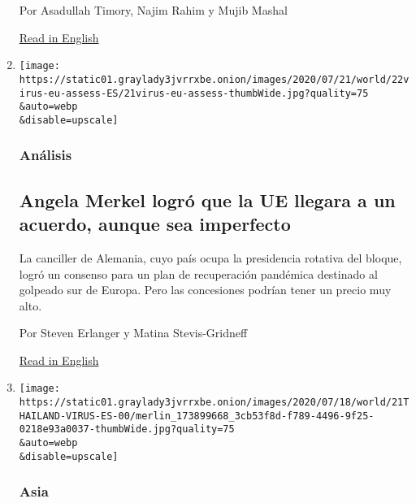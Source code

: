 \begin{enumerate}
  Por Asadullah Timory, Najim Rahim y Mujib Mashal

  \href{https://www.nytimes3xbfgragh.onion/2020/07/22/world/asia/afghan-hero-woman-taliban.html}{Read
  in English}
\item
  \href{/es/2020/07/22/espanol/mundo/coronavirus-union-europea-estimulo.html}{}

  \texttt{[image: https://static01.graylady3jvrrxbe.onion/images/2020/07/21/world/22virus-eu-assess-ES/21virus-eu-assess-thumbWide.jpg?quality=75\\\&auto=webp\\\&disable=upscale]}

  \hypertarget{anuxe1lisis}{%
  \subsubsection{Análisis}\label{anuxe1lisis}}

  \hypertarget{angela-merkel-logruxf3-que-la-ue-llegara-a-un-acuerdo-aunque-sea-imperfecto}{%
  \subsection{Angela Merkel logró que la UE llegara a un acuerdo, aunque
  sea
  imperfecto}\label{angela-merkel-logruxf3-que-la-ue-llegara-a-un-acuerdo-aunque-sea-imperfecto}}

  La canciller de Alemania, cuyo país ocupa la presidencia rotativa del
  bloque, logró un consenso para un plan de recuperación pandémica
  destinado al golpeado sur de Europa. Pero las concesiones podrían
  tener un precio muy alto.

  Por Steven Erlanger y Matina Stevis-Gridneff

  \href{https://www.nytimes3xbfgragh.onion/2020/07/21/world/europe/european-union-coronavirus-aid.html}{Read
  in English}
\item
  \href{/es/2020/07/21/espanol/mundo/coronavirus-tailandia.html}{}

  \texttt{[image: https://static01.graylady3jvrrxbe.onion/images/2020/07/18/world/21THAILAND-VIRUS-ES-00/merlin\_173899668\_3cb53f8d-f789-4496-9f25-0218e93a0037-thumbWide.jpg?quality=75\\\&auto=webp\\\&disable=upscale]}

  \hypertarget{asia-2}{%
  \subsubsection{Asia}\label{asia-2}}

  \hypertarget{nadie-sabe-quuxe9-es-lo-que-tailandia-hace-bien-para-enfrentar-la-pandemia-pero-ha-funcionado}{%
}
\end{enumerate}
